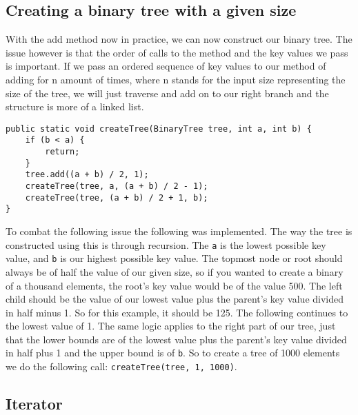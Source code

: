 \documentclass[a4paper,11pt]{article}
\begin{document}
    \subsection*{Creating a binary tree with a given size}

        With the add method now in practice, we can now construct our binary tree. The issue however is that the order of calls to the method and the key values we pass is important. If we pass an ordered sequence of key values to our method of adding for n amount of times, where n stands for the input size representing the size of the tree, we will just traverse and add on to our right branch and the structure is more of a linked list. 
\begin{verbatim}
public static void createTree(BinaryTree tree, int a, int b) {
    if (b < a) {
        return;
    }
    tree.add((a + b) / 2, 1);
    createTree(tree, a, (a + b) / 2 - 1);
    createTree(tree, (a + b) / 2 + 1, b);
}
\end{verbatim}
        To combat the following issue the following was implemented. The way the tree is constructed using this is through recursion. The \texttt{a} is the lowest possible key value, and \texttt{b} is our highest possible key value. The topmost node or root should always be of half the value of our given size, so if you wanted to create a binary of a thousand elements, the root's key value would be of the value 500. The left child should be the value of our lowest value plus the parent's key value divided in half minus 1. So for this example, it should be 125. The following continues to the lowest value of 1. The same logic applies to the right part of our tree, just that the lower bounds are of the lowest value plus the parent's key value divided in half plus 1 and the upper bound is of \texttt{b}. So to create a tree of 1000 elements we do the following call: \texttt{createTree(tree, 1, 1000)}.

    \subsection*{Iterator}
\end{document}
